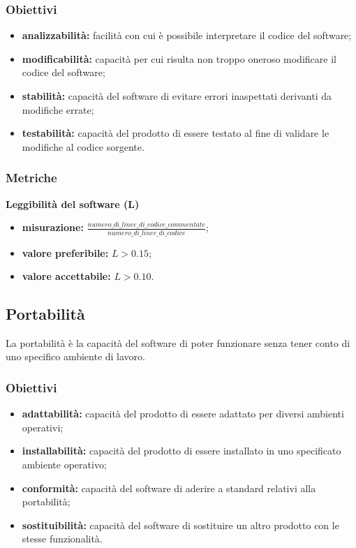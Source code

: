 \subsubsection{Obiettivi}
\begin{itemize}
	\item \textbf{analizzabilità:} facilità con cui è possibile interpretare il codice del software;
	\item \textbf{modificabilità:} capacità per cui risulta non troppo oneroso modificare il codice del software;
	\item \textbf{stabilità:} capacità del software di evitare errori inaspettati derivanti da modifiche errate;
	\item \textbf{testabilità:} capacità del prodotto di essere testato al fine di validare le modifiche al codice sorgente.
\end{itemize}
\subsubsection{Metriche}
\textbf{Leggibilità del software (L)}\\
\begin{itemize}
	\item \textbf{misurazione:} $\frac{numero\_di\_linee\_di\_codice\_commentate}{numero\_di\_linee\_di\_codice}$;
	\item \textbf{valore preferibile:} $L > 0.15$;
	\item \textbf{valore accettabile:} $L > 0.10$.
\end{itemize}


\subsection{Portabilità}
La portabilità è la capacità del software di poter funzionare senza tener conto di uno specifico ambiente di lavoro.
\subsubsection{Obiettivi}
\begin{itemize}
	\item \textbf{adattabilità:} capacità del prodotto di essere adattato per diversi ambienti operativi;
	\item \textbf{installabilità:} capacità del prodotto di essere installato in uno specificato ambiente operativo;
	\item \textbf{conformità:} capacità del software di aderire a standard relativi alla portabilità;
	\item \textbf{sostituibilità:} capacità del software di sostituire un altro prodotto con le stesse funzionalità.
\end{itemize}
